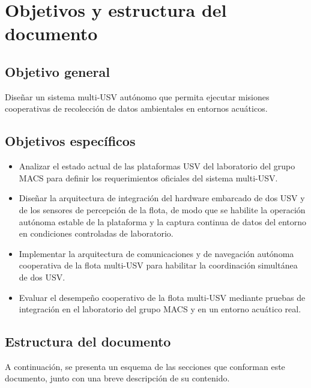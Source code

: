 \section{Objetivos y estructura del documento}


\subsection{Objetivo general}

Diseñar un sistema multi-USV autónomo que permita ejecutar misiones cooperativas de recolección de datos ambientales en entornos acuáticos.

\subsection{Objetivos específicos}

\begin{itemize}
    \item Analizar el estado actual de las plataformas USV del laboratorio del grupo MACS para 
    definir los requerimientos oficiales del sistema multi-USV.
    \item Diseñar la arquitectura de integración del hardware embarcado de dos USV y de los sensores de 
    percepción de la flota, de modo que se habilite la operación autónoma estable de la 
    plataforma y la captura continua de datos del entorno en condiciones controladas de 
    laboratorio.
    \item Implementar la arquitectura de comunicaciones y de navegación autónoma cooperativa 
    de la flota multi-USV para habilitar la coordinación simultánea de dos USV.
    \item Evaluar el desempeño cooperativo de la flota multi-USV mediante pruebas de 
    integración en el laboratorio del grupo MACS y en un entorno acuático real.
\end{itemize}

\newpage

\subsection{Estructura del documento}

A continuación, se presenta un esquema de las secciones que conforman este documento, junto con una breve descripción de su contenido.


